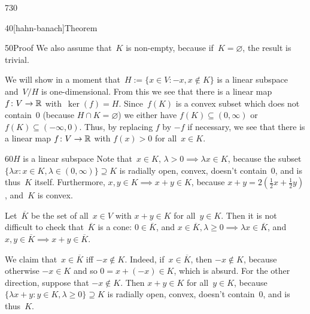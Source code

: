 \begin{parsec}{730}
\begin{point}{40}[hahn-banach]{Theorem}
\begin{point}{50}{Proof}
We also assume that~$K$ is non-empty,
because if~$K=\varnothing$, the result is trivial.

We will show in a moment that~$H:=\{x\in V\colon -x,x\notin K\}$
is a linear subspace and~$V/H$ is one-dimensional.
From this we see that there is a linear map $f\colon V\to\mathbb{R}$
with~$\ker(f)=H$.
Since~$f(K)$ is a convex subset which does not contain~$0$
(because $H\cap K=\varnothing$)
we either have $f(K)\subseteq (0,\infty)$
or $f(K)\subseteq(-\infty,0)$.
Thus, by replacing $f$ by $-f$ if necessary,
we see that there is a linear map $f\colon V\to \mathbb{R}$
with $f(x)>0$ for all~$x\in K$.
\begin{point}{60}{$H$ is a linear subspace}%
Note that~$x\in K,\,\lambda>0\implies \lambda x\in K$,
because the subset 
$\{\lambda x\colon x\in K,\lambda\in(0,\infty)\}\supseteq K$
is radially open, convex, doesn't contain~$0$,
and is thus~$K$ itself.
Furthermore,
$x,y\in K\implies x+y\in K$, because
$x+y=2(\frac{1}{2}x + \frac{1}{2}y)$, and~$K$ is convex.

Let~$\overline{K}$ be the set of all~$x\in V$
with $x+y\in K$ for all~$y\in K$.
Then it is not difficult to check that~$\overline{K}$ is a cone:
 $0\in\overline{K}$,
and
$x\in \overline{K},\lambda\geq 0\implies \lambda x\in \overline{K}$, and
$x,y\in\overline{K}\implies x+y\in \overline{K}$.

We claim that~$x\in \overline{K}$ iff $-x\notin K$.
Indeed, if~$x\in\overline{K}$, then $-x\notin K$, because otherwise
$-x\in K$ and so
$0=x+(-x)\in K$, which is absurd.
For the other direction, suppose that $-x\notin K$.
Then $x+y\in K$ for all~$y\in K$,
because
$\{\lambda x+y\colon y\in K,\lambda\geq0\}\supseteq K$
is radially open, convex, doesn't contain~$0$,
and is thus~$K$.


\end{point}
\end{point}
\end{point}
\end{parsec}

